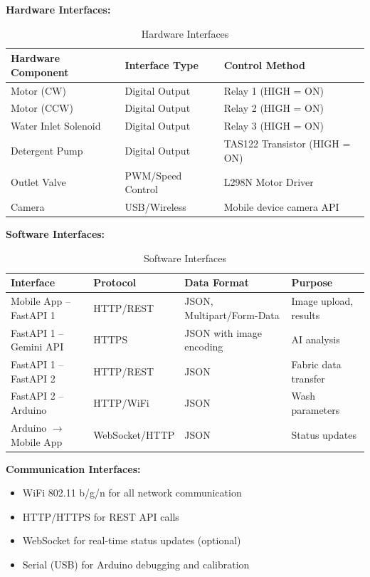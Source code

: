 \textbf{Hardware Interfaces:}
\begin{table}[H]
    \centering
    \begin{tabular}{|l|l|l|}
        \hline
        \textbf{Hardware Component} & \textbf{Interface Type} & \textbf{Control Method} \\
        \hline
        Motor (CW) & Digital Output & Relay 1 (HIGH = ON) \\
        \hline
        Motor (CCW) & Digital Output & Relay 2 (HIGH = ON) \\
        \hline
        Water Inlet Solenoid & Digital Output & Relay 3 (HIGH = ON) \\
        \hline
        Detergent Pump & Digital Output & TAS122 Transistor (HIGH = ON) \\
        \hline
        Outlet Valve & PWM/Speed Control & L298N Motor Driver \\
        \hline
        Camera & USB/Wireless & Mobile device camera API \\
        \hline
    \end{tabular}
    \caption{Hardware Interfaces}
    \label{tab:hardware_if}
\end{table}

\newpage
\textbf{Software Interfaces:}
\begin{table}[H]
    \centering
    \begin{tabularx}{\textwidth}{|l|l|l|X|}
        \hline
        \textbf{Interface} & \textbf{Protocol} & \textbf{Data Format} & \textbf{Purpose} \\
        \hline
        Mobile App -- FastAPI 1 & HTTP/REST & JSON, Multipart/Form-Data & Image upload, results \\
        \hline
        FastAPI 1 -- Gemini API & HTTPS & JSON with image encoding & AI analysis \\
        \hline
        FastAPI 1 -- FastAPI 2 & HTTP/REST & JSON & Fabric data transfer \\
        \hline
        FastAPI 2 -- Arduino & HTTP/WiFi & JSON & Wash parameters \\
        \hline
        Arduino $\rightarrow$ Mobile App & WebSocket/HTTP & JSON & Status updates \\
        \hline
    \end{tabularx}
    \caption{Software Interfaces}
    \label{tab:software_if}
\end{table}

\textbf{Communication Interfaces:}
\begin{itemize}
    \item WiFi 802.11 b/g/n for all network communication
    \item HTTP/HTTPS for REST API calls
    \item WebSocket for real-time status updates (optional)
    \item Serial (USB) for Arduino debugging and calibration
\end{itemize}

